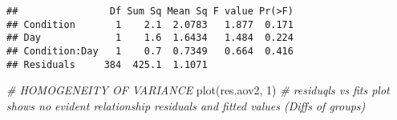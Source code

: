 \documentclass[
]{article}
\newenvironment{Shaded}{\begin{snugshade}}{\end{snugshade}}
\newcommand{\AttributeTok}[1]{\textcolor[rgb]{0.77,0.63,0.00}{#1}}
\newcommand{\CommentTok}[1]{\textcolor[rgb]{0.56,0.35,0.01}{\textit{#1}}}
\newcommand{\DecValTok}[1]{\textcolor[rgb]{0.00,0.00,0.81}{#1}}
\newcommand{\DocumentationTok}[1]{\textcolor[rgb]{0.56,0.35,0.01}{\textbf{\textit{#1}}}}
\newcommand{\FunctionTok}[1]{\textcolor[rgb]{0.00,0.00,0.00}{#1}}
\newcommand{\NormalTok}[1]{#1}
\newcommand{\OtherTok}[1]{\textcolor[rgb]{0.56,0.35,0.01}{#1}}
\newcommand{\SpecialCharTok}[1]{\textcolor[rgb]{0.00,0.00,0.00}{#1}}
\begin{document}
\begin{Shaded}
\end{Shaded}

\begin{verbatim}
##                Df Sum Sq Mean Sq F value Pr(>F)
## Condition       1    2.1  2.0783   1.877  0.171
## Day             1    1.6  1.6434   1.484  0.224
## Condition:Day   1    0.7  0.7349   0.664  0.416
## Residuals     384  425.1  1.1071
\end{verbatim}

\begin{Shaded}
\begin{Highlighting}[]
\CommentTok{\# HOMOGENEITY OF VARIANCE}
\FunctionTok{plot}\NormalTok{(res.aov2, }\DecValTok{1}\NormalTok{) }\CommentTok{\# residuqls vs fits plot shows no evident relationship residuals and fitted values (Diffs of groups)}
\end{Highlighting}
\end{Shaded}
\end{document}
